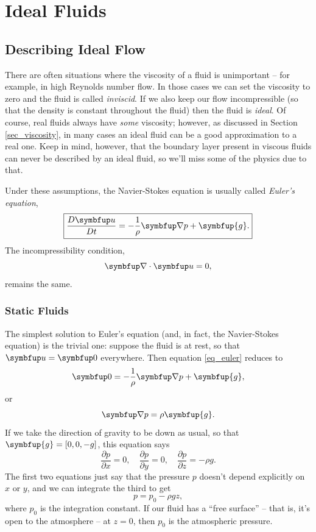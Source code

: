 \chapter{Ideal Fluids}

\section{Describing Ideal Flow}

There are often situations where the viscosity of a fluid is unimportant -- for example, in high Reynolds number flow.  In those cases we can set the viscosity to zero and the fluid is called \emph{inviscid}.  If we also keep our flow incompressible (so that the density is constant throughout the fluid) then the fluid is \emph{ideal}.  Of course, real fluids always have \emph{some} viscosity; however, as discussed in Section \ref{sec_viscosity}, in many cases an ideal fluid can be a good approximation to a real one.  Keep in mind, however, that the boundary layer present in viscous fluids can never be described by an ideal fluid, so we'll miss some of the physics due to that.

Under these assumptions, the Navier-Stokes equation is usually called \emph{Euler's equation},
\begin{equation}
\label{eq_euler}
\boxed{
\frac{D \uu}{Dt} = -\frac{1}{\rho} \grad p + \symbfup{g}.
}
\end{equation}
The incompressibility condition,
\begin{equation}
\grad \cdot \uu = 0,
\end{equation}
remains the same.



\subsection{Static Fluids}

The simplest solution to Euler's equation (and, in fact, the Navier-Stokes equation) is the trivial one:  suppose the fluid is at rest, so that $\uu = \vec{0}$ everywhere.  Then equation \ref{eq_euler} reduces to 
\[
\vec{0} = -\frac{1}{\rho} \grad p + \symbfup{g},
\]
or 
\[
\grad p = \rho \symbfup{g}.
\]
If we take the direction of gravity to be down as usual, so that $\symbfup{g} = [0,0,-g]$, this equation says
\[
\frac{\partial p}{\partial x} = 0, \quad \frac{\partial p}{\partial y} = 0, \quad \frac{\partial p}{\partial z} = -\rho g.
\]
The first two equations just say that the pressure $p$ doesn't depend explicitly on $x$ or $y$, and we can integrate the third to get
\begin{equation}
p = p_0 - \rho g z,
\end{equation}
where $p_0$ is the integration constant.  If our fluid has a ``free surface'' -- that is, it's open to the atmosphere -- at $z=0$, then $p_0$ is the atmospheric pressure.

